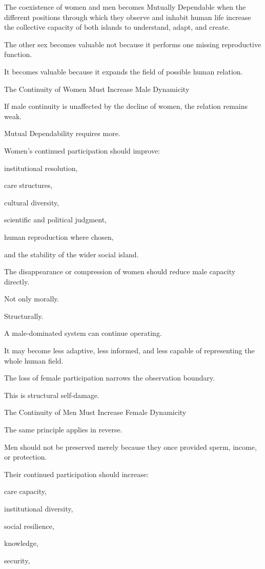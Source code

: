 The coexistence of women and men becomes Mutually Dependable when the different positions through which they observe and inhabit human life increase the collective capacity of both islands to understand, adapt, and create.

The other sex becomes valuable not because it performs one missing reproductive function.

It becomes valuable because it expands the field of possible human relation.

The Continuity of Women Must Increase Male Dynamicity

If male continuity is unaffected by the decline of women, the relation remains weak.

Mutual Dependability requires more.

Women’s continued participation should improve:

institutional resolution,

care structures,

cultural diversity,

scientific and political judgment,

human reproduction where chosen,

and the stability of the wider social island.

The disappearance or compression of women should reduce male capacity directly.

Not only morally.

Structurally.

A male-dominated system can continue operating.

It may become less adaptive, less informed, and less capable of representing the whole human field.

The loss of female participation narrows the observation boundary.

This is structural self-damage.

The Continuity of Men Must Increase Female Dynamicity

The same principle applies in reverse.

Men should not be preserved merely because they once provided sperm, income, or protection.

Their continued participation should increase:

care capacity,

institutional diversity,

social resilience,

knowledge,

security,

